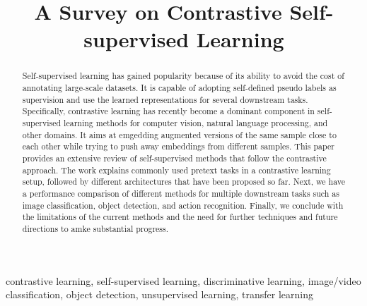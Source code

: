 \documentclass[conference]{IEEEtran}
\begin{document}
\title{A Survey on Contrastive Self-supervised Learning
}

\author{
}

\maketitle

\begin{abstract}
Self-supervised learning has gained popularity because of its ability to avoid the cost of annotating large-scale datasets.
It is capable of adopting self-defined pseudo labels as supervision and use the learned representations for several downstream tasks.
Specifically, contrastive learning has recently become a dominant component in self-supervised learning methods for computer vision, natural language processing, and other domains.
It aims at emgedding augmented versions of the same sample close to each other while trying to push away embeddings from different samples.
This paper provides an extensive review of self-supervised methods that follow the contrastive approach. 
The work explains commonly used pretext tasks in a contrastive learning setup, followed by different architectures that have been proposed so far.
Next, we have a performance comparison of different methods for multiple downstream tasks such as image classification, object detection, and action recognition.
Finally, we conclude with the limitations of the current methods and the need for further techniques and future directions to amke substantial progress.
\end{abstract}

\begin{IEEEkeywords}
contrastive learning, self-supervised learning, discriminative learning, image/video classification, object detection, unsupervised learning, transfer learning
\end{IEEEkeywords}
\end{document}

